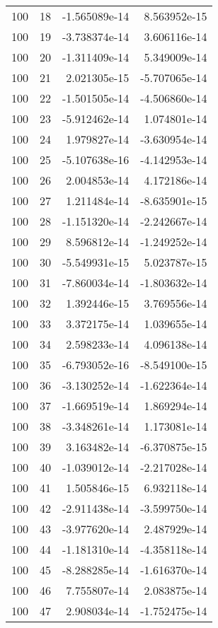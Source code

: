 \begin{tabular}{rrrr}
 100 &   18 & -1.565089e-14 &  8.563952e-15 \\
 100 &   19 & -3.738374e-14 &  3.606116e-14 \\
 100 &   20 & -1.311409e-14 &  5.349009e-14 \\
 100 &   21 &  2.021305e-15 & -5.707065e-14 \\
 100 &   22 & -1.501505e-14 & -4.506860e-14 \\
 100 &   23 & -5.912462e-14 &  1.074801e-14 \\
 100 &   24 &  1.979827e-14 & -3.630954e-14 \\
 100 &   25 & -5.107638e-16 & -4.142953e-14 \\
 100 &   26 &  2.004853e-14 &  4.172186e-14 \\
 100 &   27 &  1.211484e-14 & -8.635901e-15 \\
 100 &   28 & -1.151320e-14 & -2.242667e-14 \\
 100 &   29 &  8.596812e-14 & -1.249252e-14 \\
 100 &   30 & -5.549931e-15 &  5.023787e-15 \\
 100 &   31 & -7.860034e-14 & -1.803632e-14 \\
 100 &   32 &  1.392446e-15 &  3.769556e-14 \\
 100 &   33 &  3.372175e-14 &  1.039655e-14 \\
 100 &   34 &  2.598233e-14 &  4.096138e-14 \\
 100 &   35 & -6.793052e-16 & -8.549100e-15 \\
 100 &   36 & -3.130252e-14 & -1.622364e-14 \\
 100 &   37 & -1.669519e-14 &  1.869294e-14 \\
 100 &   38 & -3.348261e-14 &  1.173081e-14 \\
 100 &   39 &  3.163482e-14 & -6.370875e-15 \\
 100 &   40 & -1.039012e-14 & -2.217028e-14 \\
 100 &   41 &  1.505846e-15 &  6.932118e-14 \\
 100 &   42 & -2.911438e-14 & -3.599750e-14 \\
 100 &   43 & -3.977620e-14 &  2.487929e-14 \\
 100 &   44 & -1.181310e-14 & -4.358118e-14 \\
 100 &   45 & -8.288285e-14 & -1.616370e-14 \\
 100 &   46 &  7.755807e-14 &  2.083875e-14 \\
 100 &   47 &  2.908034e-14 & -1.752475e-14 \\

\end{tabular}
